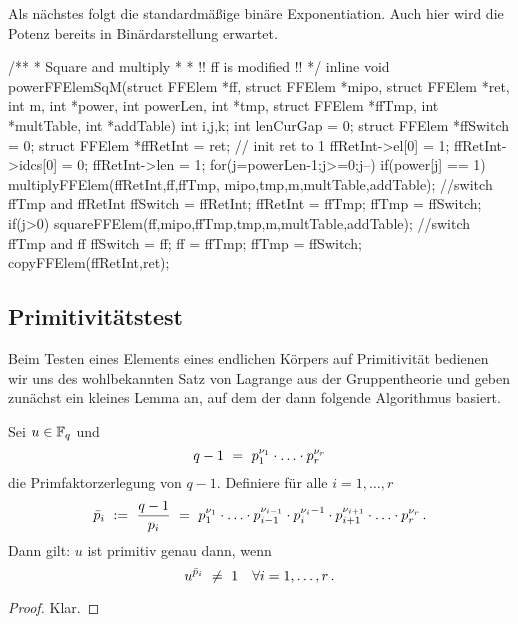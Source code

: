 Als nächstes folgt die standardmäßige binäre Exponentiation. Auch hier wird die
Potenz bereits in Binärdarstellung erwartet.

\begin{ccode}[caption={Aus \url{../Sage/enumeratePCNs.c}},
  firstnumber=602, label=lst:powerffelemsqm]
/**
 * Square and multiply
 *
 * !! ff is modified !!
 */
inline void powerFFElemSqM(struct FFElem *ff, struct FFElem *mipo,
        struct FFElem *ret, 
        int m, int *power, int powerLen,
        int *tmp, struct FFElem *ffTmp,
        int *multTable, int *addTable){
    int i,j,k;
    int lenCurGap = 0;
    struct FFElem *ffSwitch = 0;
    struct FFElem *ffRetInt = ret;
    // init ret to 1
    ffRetInt->el[0] = 1; ffRetInt->idcs[0] = 0; ffRetInt->len = 1;
    for(j=powerLen-1;j>=0;j--){
        if(power[j] == 1){
            multiplyFFElem(ffRetInt,ff,ffTmp, mipo,tmp,m,multTable,addTable);
            //switch ffTmp and ffRetInt
            ffSwitch = ffRetInt; ffRetInt = ffTmp; ffTmp = ffSwitch;
        }
        if(j>0){
            squareFFElem(ff,mipo,ffTmp,tmp,m,multTable,addTable);
            //switch ffTmp and ff
            ffSwitch = ff; ff = ffTmp; ffTmp = ffSwitch;
        }
    }
    copyFFElem(ffRetInt,ret);
}
\end{ccode}


\subsection{Primitivitätstest}
\label{subsub:primitivitaetstest}

Beim Testen eines Elements eines endlichen Körpers auf Primitivität bedienen
wir uns des wohlbekannten Satz von Lagrange aus der Gruppentheorie und geben
zunächst ein kleines Lemma an, auf dem der dann folgende Algorithmus basiert.

\begin{lemma}
  Sei $u \in \mathbb{F}_q$ und
  \[ q-1 \ =\  p_1^{\nu_1}\cdot\ldots\cdot p_r^{\nu_r}\]
  die Primfaktorzerlegung von $q-1$. Definiere
  für alle $i=1,\dots,r$
  \[ \bar p_i \ :=\   \frac{q-1}{p_i} \ =\ 
    p_1^{\nu_1}\cdot \ldots\cdot p_{i-1}^{\nu_{i-1}} \cdot
    p_i^{\nu_i-1}\cdot p_{i+1}^{\nu_{i+1}}\cdot\ldots\cdot p_r^{\nu_r}\,.\]
  Dann gilt: $u$ ist primitiv genau dann, wenn
  \[ u^{\bar p_i} \ \neq\  1\quad\forall i=1,\ldots,r \,.\]
\end{lemma}
\begin{proof}
  Klar.
\end{proof}

